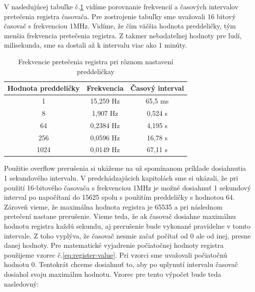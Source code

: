 V nasledujúcej tabuľke č.\ref{table:overflow-frequency} vidíme porovnanie frekvencií a časových intervalov pretečenia registra časovača. Pre zostrojenie tabuľky sme uvažovali 16 bitový časovač
s frekvenciou 1MHz.  Vidíme, že čím väčšia hodnota preddeličky, tým menšia frekvencia
pretečenia registra. Z takmer nebadateľnej hodnoty pre ľudí, milisekunda, sme sa dostali až k intervalu viac ako 1 minúty.

\begin{table}[!htbp]
    \begin{center}
        \begin{tabular}{|c|c|c|}
            \hline
            Hodnota preddeličky & Frekvencia & Časový interval    \\
            \hline
            1                   & 15,259 Hz  & 65,5 \acrshort{ms} \\
            8                   & 1,907 Hz   & 0,524 \acrshort{s} \\
            64                  & 0,2384 Hz  & 4,195 s            \\
            256                 & 0,0596 Hz  & 16,78 s            \\
            1024                & 0,0149 Hz  & 67,11 s            \\
            \hline
        \end{tabular}
        \caption{Frekvencie pretečenia registra pri rôznom nastavení preddeličkay}
        \label{table:overflow-frequency}
    \end{center}
\end{table}

Použitie overflow prerušenia si ukážeme na už spomínanom príklade dosiahnutia 1 sekundového intervalu. V predchádzajúcich kapitolách sme si ukázali,
že pri použití 16-bitového časovača s frekvenciou 1MHz je možné dosiahnuť 1 sekundový interval po napočítaní do 15625 spolu s použitím preddeličky s hodnotou 64.
Zároveň vieme, že maximálna hodnota registra je 65535 a pri následnom pretečení nastane prerušenie. Vieme teda, že ak časovač dosiahne maximálnu hodnotu registra každú
sekundu, aj prerušenie bude vykonané pravidelne v tomto intervale. Z toho vyplýva, že časovač nesmie začať počítať od 0 ale od inej, presne danej hodnoty.
Pre matematické vyjadrenie počiatočnej hodnoty registra použijeme vzorec č.\ref{eq:register-value}. Pri vzorci sme uvažovali počiatočnú hodnotu 0. Tentokrát chceme
dosiahnuť to, aby po uplynutí intervalu časovač dosiahol svoju maximálnu hodnotu. Vzorec pre tento výpočet bude teda nasledovný:

